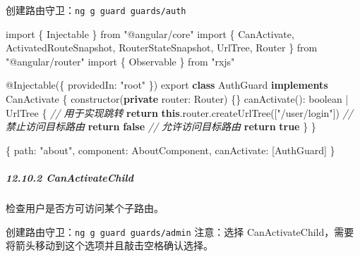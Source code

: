 \documentclass[
]{article}
\newenvironment{Shaded}{}{}
\newcommand{\AttributeTok}[1]{\textcolor[rgb]{0.49,0.56,0.16}{#1}}
\newcommand{\CommentTok}[1]{\textcolor[rgb]{0.38,0.63,0.69}{\textit{#1}}}
\newcommand{\ControlFlowTok}[1]{\textcolor[rgb]{0.00,0.44,0.13}{\textbf{#1}}}
\newcommand{\DataTypeTok}[1]{\textcolor[rgb]{0.56,0.13,0.00}{#1}}
\newcommand{\FunctionTok}[1]{\textcolor[rgb]{0.02,0.16,0.49}{#1}}
\newcommand{\ImportTok}[1]{#1}
\newcommand{\KeywordTok}[1]{\textcolor[rgb]{0.00,0.44,0.13}{\textbf{#1}}}
\newcommand{\NormalTok}[1]{#1}
\newcommand{\OperatorTok}[1]{\textcolor[rgb]{0.40,0.40,0.40}{#1}}
\newcommand{\StringTok}[1]{\textcolor[rgb]{0.25,0.44,0.63}{#1}}
\begin{document}
创建路由守卫：\texttt{ng\ g\ guard\ guards/auth}

\begin{Shaded}
\begin{Highlighting}[]
\ImportTok{import}\NormalTok{ \{ Injectable \} }\ImportTok{from} \StringTok{"@angular/core"}
\ImportTok{import}\NormalTok{ \{ CanActivate}\OperatorTok{,}\NormalTok{ ActivatedRouteSnapshot}\OperatorTok{,}\NormalTok{ RouterStateSnapshot}\OperatorTok{,}\NormalTok{ UrlTree}\OperatorTok{,}\NormalTok{ Router \} }\ImportTok{from} \StringTok{"@angular/router"}
\ImportTok{import}\NormalTok{ \{ Observable \} }\ImportTok{from} \StringTok{"rxjs"}

\NormalTok{@}\FunctionTok{Injectable}\NormalTok{(\{}
  \DataTypeTok{providedIn}\OperatorTok{:} \StringTok{"root"}
\NormalTok{\})}
\ImportTok{export} \KeywordTok{class}\NormalTok{ AuthGuard }\KeywordTok{implements}\NormalTok{ CanActivate \{}
  \FunctionTok{constructor}\NormalTok{(}\KeywordTok{private} \DataTypeTok{router}\OperatorTok{:}\NormalTok{ Router) \{\}}
  \FunctionTok{canActivate}\NormalTok{()}\OperatorTok{:}\NormalTok{ boolean }\OperatorTok{|}\NormalTok{ UrlTree \{}
    \CommentTok{// 用于实现跳转}
    \ControlFlowTok{return} \KeywordTok{this}\OperatorTok{.}\AttributeTok{router}\OperatorTok{.}\FunctionTok{createUrlTree}\NormalTok{([}\StringTok{"/user/login"}\NormalTok{])}
    \CommentTok{// 禁止访问目标路由}
    \ControlFlowTok{return} \KeywordTok{false}
    \CommentTok{// 允许访问目标路由}
    \ControlFlowTok{return} \KeywordTok{true}
\NormalTok{  \}}
\NormalTok{\}}
\end{Highlighting}
\end{Shaded}

\begin{Shaded}
\begin{Highlighting}[]
\NormalTok{\{}
  \DataTypeTok{path}\OperatorTok{:} \StringTok{"about"}\OperatorTok{,}
  \DataTypeTok{component}\OperatorTok{:}\NormalTok{ AboutComponent}\OperatorTok{,}
  \DataTypeTok{canActivate}\OperatorTok{:}\NormalTok{ [AuthGuard]}
\NormalTok{\}}
\end{Highlighting}
\end{Shaded}

\hypertarget{12102-canactivatechild}{%
\subparagraph{12.10.2 CanActivateChild}\label{12102-canactivatechild}}

检查用户是否方可访问某个子路由。

创建路由守卫：\texttt{ng\ g\ guard\ guards/admin} 注意：选择
CanActivateChild，需要将箭头移动到这个选项并且敲击空格确认选择。
\end{document}
